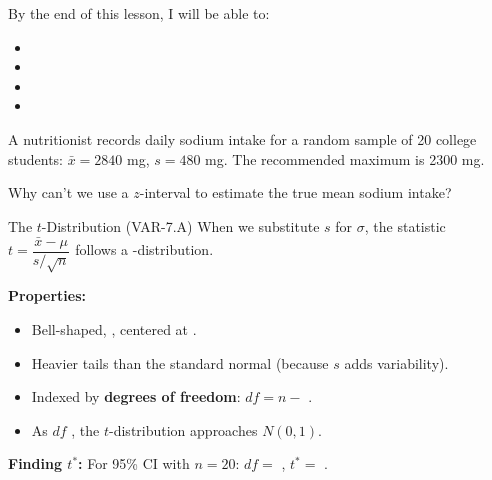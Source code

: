 \documentclass[10pt]{article}
\begin{document}
\namedateperiod

\begin{objectivebox}
By the end of this lesson, I will be able to:
\begin{itemize}
    \item[$\square$] \writeline
    \item[$\square$] \writeline
    \item[$\square$] \writeline
    \item[$\square$] \writeline
\end{itemize}
\end{objectivebox}

\begin{vocabbox}
\end{vocabbox}

\begin{hookbox}
A nutritionist records daily sodium intake for a random sample of 20 college students:
$\bar x = 2840$ mg, $s = 480$ mg. The recommended maximum is 2300 mg.

Why can't we use a $z$-interval to estimate the true mean sodium intake? 
\end{hookbox}

\begin{notesbox}{The $t$-Distribution (VAR-7.A)}
When we substitute $s$ for $\sigma$, the statistic $t = \dfrac{\bar x - \mu}{s/\sqrt{n}}$
follows a \blank{3cm}-distribution.

\vspace{0.1in}
\textbf{Properties:}
\begin{itemize}
    \item Bell-shaped, \blank{4cm}, centered at \blank{2cm}.
    \item Heavier tails than the standard normal (because $s$ adds variability).
    \item Indexed by \textbf{degrees of freedom}: $df = n - $ \blank{1cm}.
    \item As $df$ \blank{4cm}, the $t$-distribution approaches $N(0, 1)$.
\end{itemize}

\textbf{Finding $t^*$:} For 95\% CI with $n = 20$: $df = $ \blank{2cm}, $t^* = $ \blank{2.5cm}.
\end{notesbox}
\end{document}
